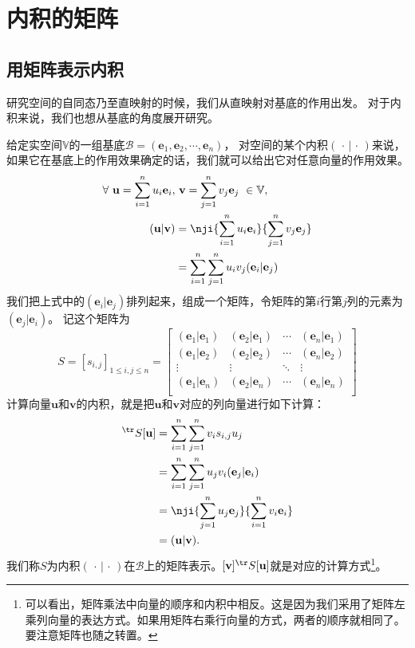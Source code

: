 \documentclass[12pt,UTF8,fontset=none]{ctexbook}
\begin{document}
\section{内积的矩阵}
\subsection{用矩阵表示内积}
研究空间的自同态乃至直映射的时候，我们从直映射对基底的作用出发。
对于内积来说，我们也想从基底的角度展开研究。

给定实空间$\mathbb{V}$的一组基底$ \mathcal{B} = (\mathbf{e}_1, \mathbf{e}_2, \cdots , \mathbf{e}_n )$，
对空间的某个内积$(\,\cdot \,|\, \cdot\,)$来说，如果它在基底上的作用效果确定的话，我们就可以给出它对任意向量的作用效果。
\begin{align*}
    \forall \,\, \mathbf{u} = \sum_{i=1}^n u_i \mathbf{e}_i , & \,\,\mathbf{v} = \sum_{j=1}^n v_j \mathbf{e}_j  \,\,\in \mathbb{V},  \\
    ( \mathbf{u} |  \mathbf{v} ) &= \nji{\sum_{i=1}^n u_i \mathbf{e}_i}{\sum_{j=1}^n v_j \mathbf{e}_j}  \\
    &= \sum_{i=1}^n \sum_{j=1}^n u_i v_j (\mathbf{e}_i|\mathbf{e}_j) 
\end{align*}
我们把上式中的$(\mathbf{e}_i|\mathbf{e}_j)$排列起来，组成一个矩阵，令矩阵的第$i$行第$j$列的元素为$(\mathbf{e}_j|\mathbf{e}_i)$。
记这个矩阵为
$$
S = [s_{i,j}]_{1 \leqslant i, j \leqslant n} = \begin{bmatrix}
    (\mathbf{e}_1|\mathbf{e}_1) & (\mathbf{e}_2|\mathbf{e}_1) & \cdots & (\mathbf{e}_n|\mathbf{e}_1) \\
    (\mathbf{e}_1|\mathbf{e}_2) & (\mathbf{e}_2|\mathbf{e}_2) & \cdots & (\mathbf{e}_n|\mathbf{e}_2) \\
    \vdots & \vdots & \ddots & \vdots \\
    (\mathbf{e}_1|\mathbf{e}_n) & (\mathbf{e}_2|\mathbf{e}_n) & \cdots & (\mathbf{e}_n|\mathbf{e}_n) \\
\end{bmatrix}
$$
计算向量$\mathbf{u}$和$\mathbf{v}$的内积，就是把$\mathbf{u}$和$\mathbf{v}$对应的列向量进行如下计算：
\begin{align*}
    [\mathbf{v}]^{\tr} S [\mathbf{u}] &= \sum_{i=1}^n \sum_{j=1}^n v_i s_{i,j} u_j   \\
    &= \sum_{i=1}^n \sum_{j=1}^n u_j v_i (\mathbf{e}_j |\mathbf{e}_i )  \\
    &= \nji{\sum_{j=1}^n u_j \mathbf{e}_j}{\sum_{i=1}^n v_i \mathbf{e}_i}  \\
    &= ( \mathbf{u}  | \mathbf{v}  ). 
\end{align*}
我们称$S$为内积$(\,\cdot \,|\, \cdot\,)$在$\mathcal{B}$上的矩阵表示。$[\mathbf{v}]^{\tr} S [\mathbf{u}]$就是对应的计算方式\footnote{可以看出，矩阵乘法中向量的顺序和内积中相反。这是因为我们采用了矩阵左乘列向量的表达方式。如果用矩阵右乘行向量的方式，两者的顺序就相同了。要注意矩阵也随之转置。}。
\end{document}
